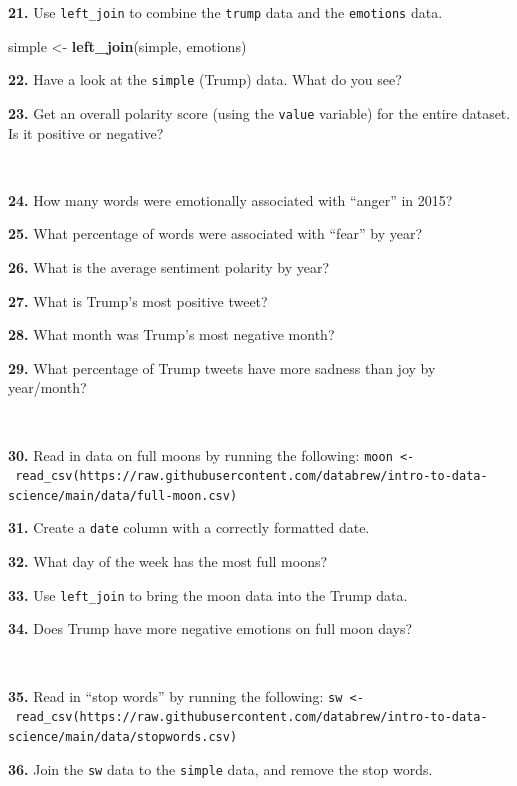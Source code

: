 \documentclass[]{book}
\newenvironment{Shaded}{\begin{snugshade}}{\end{snugshade}}
\newcommand{\KeywordTok}[1]{\textcolor[rgb]{0.13,0.29,0.53}{\textbf{#1}}}
\newcommand{\NormalTok}[1]{#1}
\newcommand{\StringTok}[1]{\textcolor[rgb]{0.31,0.60,0.02}{#1}}
\begin{document}
\textbf{21.} Use \texttt{left\_join} to combine the \texttt{trump} data and the \texttt{emotions} data.

\begin{Shaded}
\begin{Highlighting}[]
\NormalTok{simple <-}\StringTok{ }\KeywordTok{left_join}\NormalTok{(simple, emotions)}
\end{Highlighting}
\end{Shaded}

\textbf{22.} Have a look at the \texttt{simple} (Trump) data. What do you see?

\textbf{23.} Get an overall polarity score (using the \texttt{value} variable) for the entire dataset. Is it positive or negative?

~

\textbf{24.} How many words were emotionally associated with ``anger'' in 2015?

\textbf{25.} What percentage of words were associated with ``fear'' by year?

\textbf{26.} What is the average sentiment polarity by year?

\textbf{27.} What is Trump's most positive tweet?

\textbf{28.} What month was Trump's most negative month?

\textbf{29.} What percentage of Trump tweets have more sadness than joy by year/month?

~

\textbf{30.} Read in data on full moons by running the following: \texttt{moon\ \textless{}-\ read\_csv(\textquotesingle{}https://raw.githubusercontent.com/databrew/intro-to-data-science/main/data/full-moon.csv\textquotesingle{})}

\textbf{31.} Create a \texttt{date} column with a correctly formatted date.

\textbf{32.} What day of the week has the most full moons?

\textbf{33.} Use \texttt{left\_join} to bring the moon data into the Trump data.

\textbf{34.} Does Trump have more negative emotions on full moon days?

~

\textbf{35.} Read in ``stop words'' by running the following: \texttt{sw\ \textless{}-\ read\_csv(\textquotesingle{}https://raw.githubusercontent.com/databrew/intro-to-data-science/main/data/stopwords.csv\textquotesingle{})}

\textbf{36.} Join the \texttt{sw} data to the \texttt{simple} data, and remove the stop words.
\end{document}
